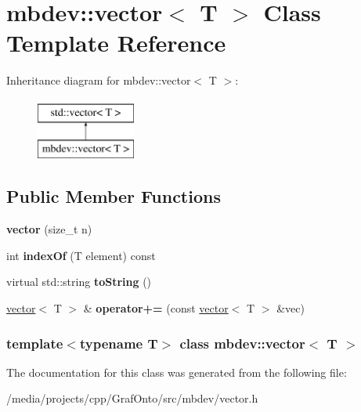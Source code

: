 \hypertarget{classmbdev_1_1vector}{\section{mbdev\-:\-:vector$<$ \-T $>$ \-Class \-Template \-Reference}
\label{classmbdev_1_1vector}
}
\-Inheritance diagram for mbdev\-:\-:vector$<$ \-T $>$\-:\begin{figure}[H]
\begin{center}
\leavevmode
\includegraphics[height=2.000000cm]{classmbdev_1_1vector}
\end{center}
\end{figure}
\subsection*{\-Public \-Member \-Functions}
\begin{DoxyCompactItemize}
\item 
\hypertarget{classmbdev_1_1vector_a9a37ea62d9ba3d2b4a2e4928c1af82f5}{{\bfseries vector} (size\-\_\-t n)}\label{classmbdev_1_1vector_a9a37ea62d9ba3d2b4a2e4928c1af82f5}

\item 
\hypertarget{classmbdev_1_1vector_a99c3219ba4f717d34cd459636592b28b}{int {\bfseries index\-Of} (\-T element) const }\label{classmbdev_1_1vector_a99c3219ba4f717d34cd459636592b28b}

\item 
\hypertarget{classmbdev_1_1vector_a23075da46c91e0e298a5d00ad75e1a37}{virtual std\-::string {\bfseries to\-String} ()}\label{classmbdev_1_1vector_a23075da46c91e0e298a5d00ad75e1a37}

\item 
\hypertarget{classmbdev_1_1vector_a9cd033551bcfa97f72a2964e7120fdfc}{\hyperlink{classmbdev_1_1vector}{vector}$<$ \-T $>$ \& {\bfseries operator+=} (const \hyperlink{classmbdev_1_1vector}{vector}$<$ \-T $>$ \&vec)}\label{classmbdev_1_1vector_a9cd033551bcfa97f72a2964e7120fdfc}

\end{DoxyCompactItemize}
\subsubsection*{template$<$typename \-T$>$ class mbdev\-::vector$<$ T $>$}



\-The documentation for this class was generated from the following file\-:\begin{DoxyCompactItemize}
\item 
/media/projects/cpp/\-Graf\-Onto/src/mbdev/vector.\-h\end{DoxyCompactItemize}
